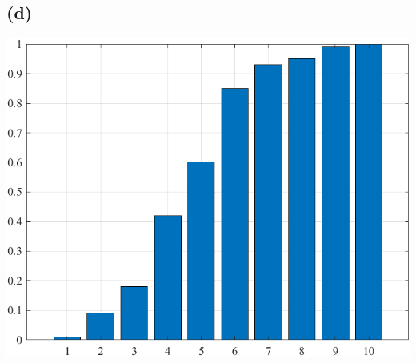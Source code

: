 \documentclass[a4paper]{scrartcl}
\begin{document}
\subsection*{(d)}

\begin{center}
	\includegraphics*[scale = 0.5]{question4d.png}
\end{center}
\end{document}
